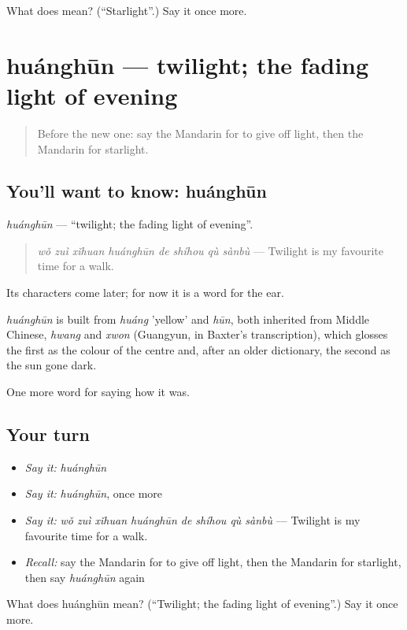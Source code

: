 \begin{tcolorbox}[breakable,colback=teal!4,colframe=teal!35!black,title={Before you move on}]
What does  mean? (\textquotedblleft{}Starlight\textquotedblright{}.) Say it once more.
\end{tcolorbox}
\section[huánghūn]{huánghūn — twilight; the fading light of evening}

\label{lesson:ZH-C517-huanghun}



\begin{quote}
Before the new one: say the Mandarin for to give off light, then the Mandarin for starlight.
\end{quote}

\subsection*{You'll want to know: huánghūn}
\emph{huánghūn} — \textquotedblleft{}twilight; the fading light of evening\textquotedblright{}.

\begin{quote}
\emph{wǒ zuì xǐhuan huánghūn de shíhou qù sànbù} — Twilight is my favourite time for a walk.
\end{quote}

Its characters come later; for now it is a word for the ear.

\begin{cousinweb}
\emph{huánghūn} is built from \emph{huáng} 'yellow' and \emph{hūn}, both inherited from Middle Chinese, \emph{hwang} and \emph{xwon} (Guangyun, in Baxter's transcription), which glosses the first as the colour of the centre and, after an older dictionary, the second as the sun gone dark.
\end{cousinweb}

\begin{grammarlens}[title={What you've built}]
One more word for saying how it was.
\end{grammarlens}

\subsection*{Your turn}
\begin{itemize}
\raggedright
  \item \emph{Say it:} \emph{huánghūn}
  \item \emph{Say it:} \emph{huánghūn}, once more
  \item \emph{Say it:} \emph{wǒ zuì xǐhuan huánghūn de shíhou qù sànbù} — Twilight is my favourite time for a walk.
  \item \emph{Recall:} say the Mandarin for to give off light, then the Mandarin for starlight, then say \emph{huánghūn} again
\end{itemize}

\begin{tcolorbox}[breakable,colback=teal!4,colframe=teal!35!black,title={Before you move on}]
What does huánghūn mean? (\textquotedblleft{}Twilight; the fading light of evening\textquotedblright{}.) Say it once more.
\end{tcolorbox}
